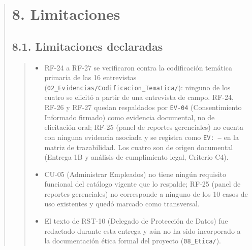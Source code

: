 \documentclass[
]{article}
\begin{document}
\begin{quote}
\section{8. Limitaciones }\label{limitaciones-trabajo-pendiente}
\subsection{8.1. Limitaciones declaradas}\label{s7-3-limitaciones-declaradas}
\begin{quote}
\begin{itemize}
  \item RF-24 a RF-27 se verificaron contra la codificación temática
  primaria de las 16 entrevistas
  (\texttt{02\_Evidencias/Codificacion\_Tematica/}): ninguno de los
  cuatro se elicitó a partir de una entrevista de campo. RF-24, RF-26
  y RF-27 quedan respaldados por \texttt{EV-04} (Consentimiento
  Informado firmado) como evidencia documental, no de elicitación
  oral; RF-25 (panel de reportes gerenciales) no cuenta con ninguna
  evidencia asociada y se registra como \texttt{EV: ---} en la matriz
  de trazabilidad. Los cuatro son de origen documental (Entrega 1B y
  análisis de cumplimiento legal, Criterio C4).
  \item CU-05 (Administrar Empleados) no tiene ningún requisito
  funcional del catálogo vigente que lo respalde; RF-25 (panel de
  reportes gerenciales) no corresponde a ninguno de los 10 casos de uso
  existentes y quedó marcado como transversal.
  \item El texto de RST-10 (Delegado de Protección de Datos) fue
  redactado durante esta entrega y aún no ha sido incorporado a la
  documentación ética formal del proyecto (\texttt{08\_Etica/}).
\end{itemize}
\end{quote}

\end{quote}
\end{document}
